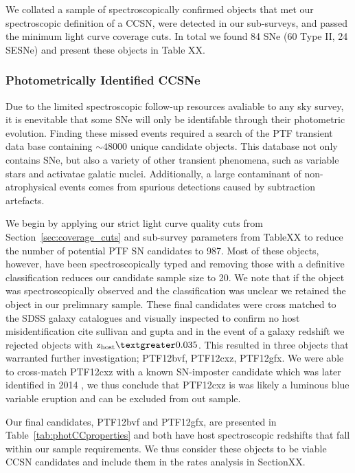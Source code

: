 \documentclass[a4paper,fleqn,usenatbib]{mnras}
\newcommand{\chris}[1]{\color{orange}#1\color{black}}
\begin{document}
We collated a sample of spectroscopically confirmed objects that met our spectroscopic definition of a CCSN, were detected in our sub-surveys, and passed the minimum light curve coverage cuts. In total we found 84 SNe (60 Type II, 24 SESNe) and present these objects in Table XX.


\subsubsection{Photometrically Identified CCSNe}
\label{sec:photCC}

Due to the limited spectroscopic follow-up resources avaliable to any sky survey, it is enevitable that some SNe will only be identifable through their photometric evolution. Finding these missed events required a search of the PTF transient data base containing $\sim 48 000$ unique candidate objects. This database not only contains SNe, but also a variety of other transient phenomena, such as variable stars and activatae galatic nuclei. Additionally, a large contaminant of non-atrophysical events comes from spurious detections caused by subtraction artefacts.

We begin by applying our strict light curve quality cuts from Section~\ref{sec:coverage_cuts} and sub-survey parameters from TableXX to reduce the number of potential PTF SN candidates to 987. Most of these objects, however, have been spectroscopically typed and removing those with a definitive classification reduces our candidate sample size to 20. We note that if the object was spectroscopically observed and the classification was unclear we retained the object in our prelimnary sample. These final candidates were cross matched to the SDSS galaxy catalogues and visually inspected to confirm no host misidentification \chris{cite sullivan and gupta} and in the event of a galaxy redshift we rejected objects with $\mathrm{z}_\mathrm{host}{\textgreater}0.035$. This resulted in three objects that warranted further investigation; PTF12bvf, PTF12cxz, PTF12gfx. We were able to cross-match PTF12cxz with a known SN-imposter candidate which was later identified in 2014 \citep{2014ATel.5737....1T}, we thus conclude that PTF12cxz is was likely a luminous blue variable eruption and can be excluded from out sample.

Our final candidates, PTF12bvf and PTF12gfx, are presented in Table~\ref{tab:photCCproperties} and both have host spectroscopic redshifts that fall within our sample requirements. We thus consider these objects to be viable CCSN candidates and include them in the rates analysis in SectionXX.
\end{document}
